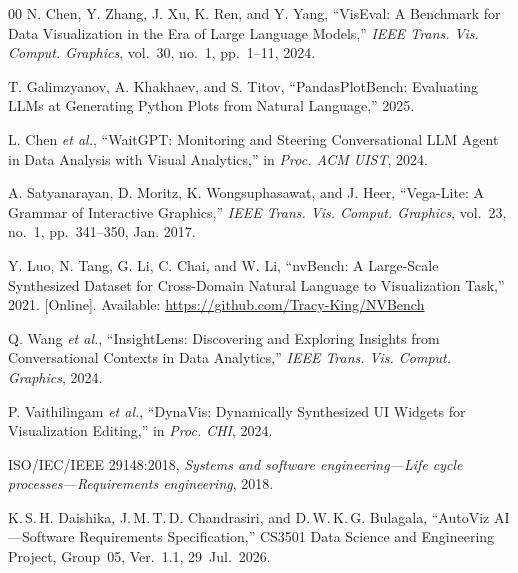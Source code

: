 \documentclass[conference]{IEEEtran}
\begin{document}
\begin{thebibliography}{00}
N. Chen, Y. Zhang, J. Xu, K. Ren, and Y. Yang, ``VisEval: A Benchmark for Data Visualization in the Era of Large Language Models,'' \emph{IEEE Trans. Vis. Comput. Graphics}, vol.~30, no.~1, pp.~1--11, 2024.

T. Galimzyanov, A. Khakhaev, and S. Titov, ``PandasPlotBench: Evaluating LLMs at Generating Python Plots from Natural Language,'' 2025.

L. Chen \emph{et al.}, ``WaitGPT: Monitoring and Steering Conversational LLM Agent in Data Analysis with Visual Analytics,'' in \emph{Proc. ACM UIST}, 2024.

A. Satyanarayan, D. Moritz, K. Wongsuphasawat, and J. Heer, ``Vega-Lite: A Grammar of Interactive Graphics,'' \emph{IEEE Trans. Vis. Comput. Graphics}, vol.~23, no.~1, pp.~341--350, Jan. 2017.

Y. Luo, N. Tang, G. Li, C. Chai, and W. Li, ``nvBench: A Large-Scale Synthesized Dataset for Cross-Domain Natural Language to Visualization Task,'' 2021. [Online]. Available: \url{https://github.com/Tracy-King/NVBench}

Q. Wang \emph{et al.}, ``InsightLens: Discovering and Exploring Insights from Conversational Contexts in Data Analytics,'' \emph{IEEE Trans. Vis. Comput. Graphics}, 2024.

P. Vaithilingam \emph{et al.}, ``DynaVis: Dynamically Synthesized UI Widgets for Visualization Editing,'' in \emph{Proc. CHI}, 2024.

ISO/IEC/IEEE 29148:2018, \emph{Systems and software engineering---Life cycle processes---Requirements engineering}, 2018.

K.\,S.\,H. Daishika, J.\,M.\,T.\,D. Chandrasiri, and D.\,W.\,K.\,G. Bulagala, ``AutoViz AI---Software Requirements Specification,'' CS3501 Data Science and Engineering Project, Group~05, Ver.~1.1, 29~Jul.~2026.
\end{thebibliography}
\end{document}
